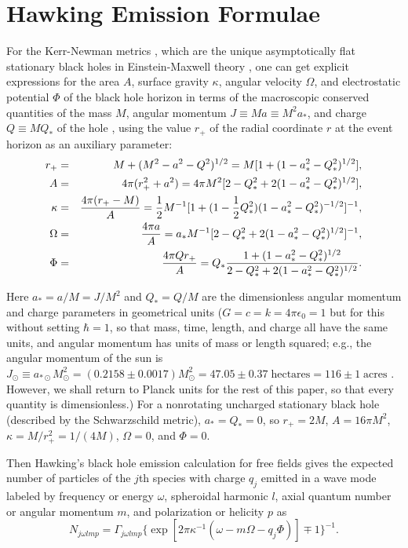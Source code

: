 \documentclass[12pt]{article} \usepackage{latexsym} \textwidth 15cm
\begin{document}
\section{Hawking Emission Formulae}

For the Kerr-Newman metrics \cite{Kerr,Newman}, which are the unique
asymptotically flat stationary black holes in Einstein-Maxwell theory
\cite{Israeluniqueness,Carteruniqueness,HE,Robinson,Mazur}, one can
get explicit expressions for the area $A$, surface gravity $\kappa$,
angular velocity $\Omega$, and electrostatic potential $\Phi$ of the
black hole horizon in terms of the macroscopic conserved quantities of
the mass $M$, angular momentum $J \equiv Ma \equiv M^2 a_*$, and
charge $Q \equiv MQ_*$ of the hole \cite{Page76}, using the value
$r_+$ of the radial coordinate $r$ at the event horizon as an
auxiliary parameter:
\begin{eqnarray}
r_+ &=& M+(M^2-a^2-Q^2)^{1/2} = M[1+(1-a_*^2-Q_*^2)^{1/2}],
 \nonumber \\
A &=& 4\pi(r_+^2+a^2) = 4\pi M^2[2-Q_*^2+2(1-a_*^2-Q_*^2)^{1/2}],
 \nonumber \\
\kappa &=& {4\pi(r_+-M)\over A}
 = {1\over 2}M^{-1}[1+(1-{1\over 2}Q_*^2)(1-a_*^2-Q_*^2)^{-1/2}]^{-1},
 \nonumber \\
\Omega &=& {4\pi a\over A}
 = a_*M^{-1}[2-Q_*^2+2(1-a_*^2-Q_*^2)^{1/2}]^{-1},
 \nonumber \\
\Phi &=& {4\pi Q r_+ \over A}
 = Q_* {1+(1-a_*^2-Q_*^2)^{1/2} \over 2-Q_*^2+2(1-a_*^2-Q_*^2)^{1/2}}.
 \label{eq:3}
 \end{eqnarray}

Here $a_* = a/M = J/M^2$ and $Q_* = Q/M$ are the dimensionless angular
momentum and charge parameters in geometrical units
($G=c=k=4\pi\epsilon_0=1$ but for this without setting $\hbar=1$, so
that mass, time, length, and charge all have the same units, and
angular momentum has units of mass or length squared; e.g., the
angular momentum of the sun is $J_{\odot} \equiv a_{*\odot}M_{\odot}^2
= (0.2158 \pm 0.0017)M_{\odot}^2 = 47.05 \pm 0.37 \; \mathrm{hectares}
= 116 \pm 1 \; \mathrm{acres}$ \cite{Pij,MAIN}.  However, we shall
return to Planck units for the rest of this paper, so that every
quantity is dimensionless.)  For a nonrotating uncharged stationary
black hole (described by the Schwarzschild metric), $a_* = Q_* = 0$,
so $r_+ = 2M$, $A = 16\pi M^2$, $\kappa = M/r_+^2 = 1/(4M)$, $\Omega =
0$, and $\Phi = 0$.

Then Hawking's black hole emission calculation \cite{Haw1,Haw2} for
free fields gives the expected number of particles of the $j$th
species with charge $q_j$ emitted in a wave mode labeled by frequency or
energy $\omega$, spheroidal harmonic $l$, axial quantum number or
angular momentum $m$, and polarization or helicity $p$ as
 \begin{equation}
 N_{j\omega lmp} =
  \Gamma_{j\omega lmp}\{\exp[2\pi\kappa^{-1}(\omega-m\Omega-q_j\Phi)]
   \mp 1\}^{-1}.
 \label{eq:4}
 \end{equation}
\end{document}
